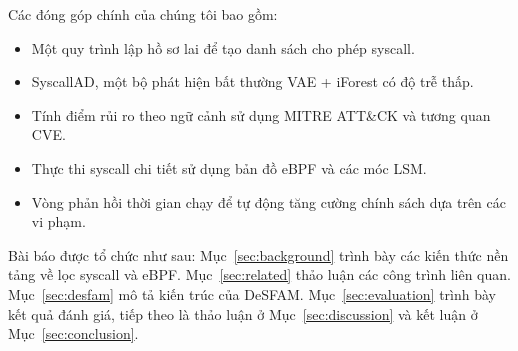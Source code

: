 Các đóng góp chính của chúng tôi bao gồm:
\begin{itemize}
  \item Một quy trình lập hồ sơ lai để tạo danh sách cho phép syscall.
  \item SyscallAD, một bộ phát hiện bất thường VAE + iForest có độ trễ thấp.
  \item Tính điểm rủi ro theo ngữ cảnh sử dụng MITRE ATT\&CK và tương quan CVE.
  \item Thực thi syscall chi tiết sử dụng bản đồ eBPF và các móc LSM.
  \item Vòng phản hồi thời gian chạy để tự động tăng cường chính sách dựa trên các vi phạm.
\end{itemize}

Bài báo được tổ chức như sau: Mục~\ref{sec:background} trình bày các kiến thức nền tảng về lọc syscall và eBPF. Mục~\ref{sec:related} thảo luận các công trình liên quan. Mục~\ref{sec:desfam} mô tả kiến trúc của DeSFAM. Mục~\ref{sec:evaluation} trình bày kết quả đánh giá, tiếp theo là thảo luận ở Mục~\ref{sec:discussion} và kết luận ở Mục~\ref{sec:conclusion}.

